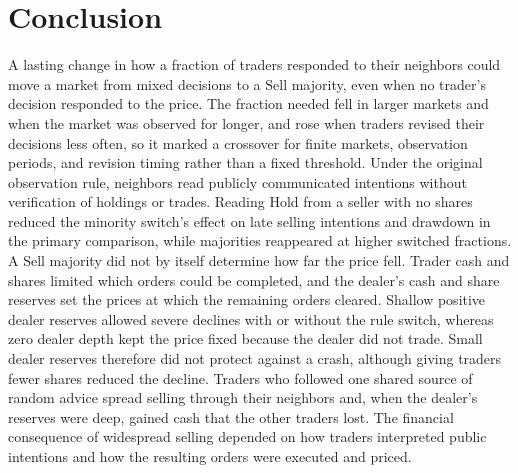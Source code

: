 \section{Conclusion}

A lasting change in how a fraction of traders responded to their
neighbors could move a market from mixed decisions to a Sell majority,
even when no trader's decision responded to the price. The fraction
needed fell in larger markets and when the market was observed for
longer, and rose when traders revised their decisions less often, so it
marked a crossover for finite markets, observation periods, and revision
timing rather than a fixed threshold. Under the original observation
rule, neighbors read publicly communicated intentions without
verification of holdings or trades.
Reading Hold from a seller with no shares reduced the minority switch's
effect on late selling intentions and drawdown in the primary
comparison, while majorities reappeared at higher switched fractions.
A Sell majority did not by itself
determine how far the price fell. Trader cash and shares limited which
orders could be completed, and the dealer's cash and share reserves set
the prices at which the remaining orders cleared. Shallow positive
dealer reserves allowed severe declines with or without the rule switch,
whereas zero dealer depth kept the price fixed because the dealer did
not trade. Small dealer reserves therefore did not protect against a
crash, although giving traders fewer shares reduced the decline. Traders
who followed one
shared source of random advice spread selling through their neighbors
and, when the dealer's reserves were deep, gained cash that the other
traders lost. The financial
consequence of widespread selling depended on how traders interpreted
public intentions and how the resulting orders were executed and priced.
